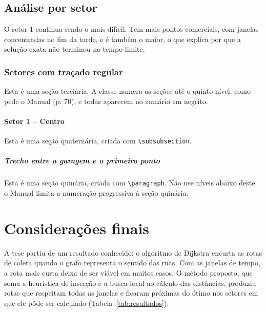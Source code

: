 \documentclass[tese,capa]{texufpel}
\begin{document}
\section{Análise por setor}

O setor 1 continua sendo o mais difícil. Tem mais pontos comerciais, com
janelas concentradas no fim da tarde, e é também o maior, o que explica por
que a solução exata não terminou no tempo limite.

\subsection{Setores com traçado regular}

Esta é uma seção terciária. A classe numera as seções até o quinto nível,
como pede o Manual (p. 70), e todas aparecem no sumário em negrito.

\subsubsection{Setor 1 -- Centro}

Esta é uma seção quaternária, criada com \verb|\subsubsection|.

\paragraph{Trecho entre a garagem e o primeiro ponto}

Esta é uma seção quinária, criada com \verb|\paragraph|. Não use níveis abaixo
deste: o Manual limita a numeração progressiva à seção quinária.

\chapter{Considerações finais}
\label{cap:consideracoes}

A tese partiu de um resultado conhecido: o algoritmo de Dijkstra encurta as
rotas de coleta quando o grafo representa o sentido das ruas. Com as janelas
de tempo, a rota mais curta deixa de ser viável em muitos casos. O método
proposto, que soma a heurística de inserção e a busca local ao cálculo das
distâncias, produziu rotas que respeitam todas as janelas e ficaram próximas
do ótimo nos setores em que ele pôde ser calculado
(Tabela~\ref{tab:resultados}).
\end{document}
